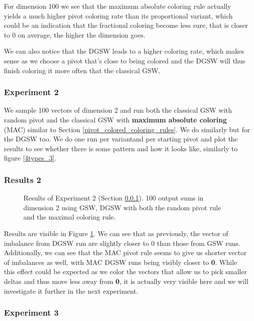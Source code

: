 \documentclass[12pt]{article}
\begin{document}
For dimension 100 we see that the maximum absolute coloring rule actually yields a much higher pivot coloring rate than its proportional variant, which could be an indication that the fractional coloring become less sure, that is closer to 0 on average, the higher the dimension goes.

We can also notice that the DGSW leads to a higher coloring rate, which makes sense as we choose a pivot that's close to being colored and the DGSW will thus finish coloring it more often that the classical GSW.

\subsubsection{Experiment 2}\label{exp_plot_max_col}
We sample 100 vectors of dimension 2 and run both the classical GSW with random pivot and the classical GSW with \textbf{maximum absolute coloring} (MAC) similar to Section \ref{pivot_colored_coloring_rules}. We do similarly but for the DGSW too. We do one run per variantand per starting pivot and plot the results to see whether there is some pattern and how it looks like, similarly to figure \ref{4types_3}.

\subsubsection{Results 2}
\begin{figure}[h]
\centering

\caption{Results of Experiment 2 (Section \ref{exp_plot_max_col}). 100 output sums in dimension 2 using GSW, DGSW with both the random pivot rule and the maximal coloring rule.}
\label{results_plot_max_col}
\end{figure}
Results are visible in Figure \ref{results_plot_max_col}. We can see that as previously, the vector of imbalance from DGSW run are slightly closer to 0 than those from GSW runs. Additionally, we can see that the MAC pivot rule seems to give us shorter vector of imbalances as well, with MAC DGSW runs being visibly closer to \textbf{0}. While this effect could be expected as we color the vectors that allow us to pick smaller deltas and thus move less away from \textbf{0}, it is actually very visible here and we will investigate it further in the next experiment.

\subsubsection{Experiment 3}
\end{document}
